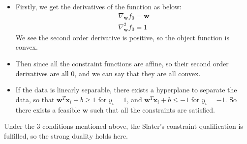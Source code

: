 \documentclass{article}
\begin{document}
\begin{itemize}
	\item 
	Firstly, we get the derivatives of the function as below:
	\begin{eqnarray}
	\nabla_{\bm{w}}f_0 = \bm{w}\\
	\nabla_{\bm{w}}^2f_0 = 1
	\end{eqnarray}
	We see the second order derivative is positive, so the object function is convex.\\
	\item Then since all the constraint functions are affine, so their second order derivatives are all 0, and we can say that they are all convex.\\
	\item If the data is linearly separable, there exists a hyperplane to separate the data, so that $\bm{w}^T\bm{x}_i + b \geq 1$ for $y_i=1$, and $\bm{w}^T\bm{x}_i + b \leq -1$ for $y_i=-1$. So there exists a feasible $\bm{w}$ such that all the constraints are satisfied.
\end{itemize}             
Under the 3 conditions mentioned above, the Slater's constraint qualification is fulfilled, so the strong duality holds here.



\small


\end{document}
